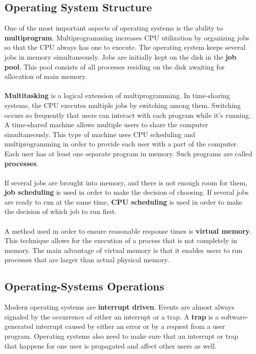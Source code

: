 \documentclass{article}
\begin{document}
\subsection{Operating System Structure}
One of the most important aspects of operating systems is the ability to \textbf{multiprogram}. Multiprogramming increases CPU utilization by organizing jobs so that the CPU always has one to execute. The operating system keeps several jobs in memory simultaneously. Jobs are initially kept on the disk in the \textbf{job pool}. This pool consists of all processes residing on the disk awaiting for allocation of main memory. \\ \\ \textbf{Multitasking} is a logical extension of multiprogramming. In time-sharing systems, the CPU executes multiple jobs by switching among them. Switching occurs so frequently that users can interact with each program while it's running. A time-shared machine allows multiple users to share the computer simultaneously. This type of machine uses CPU scheduling and multiprogramming in order to provide each user with a part of the computer. Each user has at least one separate program in memory. Such programs are called \textbf{processes}. \\ \\
If several jobs are brought into memory, and there is not enough room for them, \textbf{job scheduling} is used in order to make the decision of choosing. If several jobs are ready to run at the same time, \textbf{CPU scheduling} is used in order to make the decision of which job to run first. \\ \\
A method used in order to ensure reasonable response times is \textbf{virtual memory}. This technique allows for the execution of a process that is not completely in memory. The main advantage of virtual memory is that it enables users to run processes that are larger than actual physical memory.

\subsection{Operating-Systems Operations}
Modern operating systems are \textbf{interrupt driven}. Events are almost always signaled by the occurrence of either an interrupt or a trap. A \textbf{trap} is a software-generated interrupt caused by either an error or by a request from a user program. Operating systems also need to make sure that an interrupt or trap that happens for one user is propagated and affect other users as well.
\end{document}
